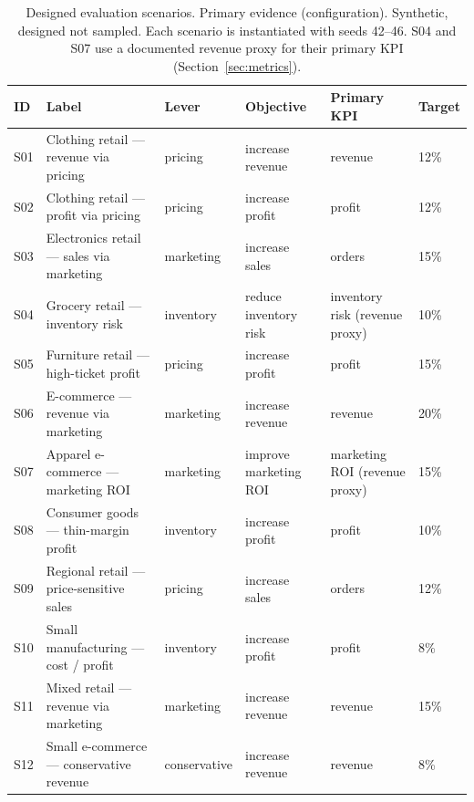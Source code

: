 \documentclass[conference]{IEEEtran}
\begin{document}
\begin{table}[!t]
\caption{Designed evaluation scenarios. Primary evidence (configuration).
Synthetic, designed not sampled. Each scenario is instantiated with seeds
42--46. S04 and S07 use a documented revenue proxy for their primary KPI
(Section~\ref{sec:metrics}).}
\label{tab:scenarios}
\centering
\renewcommand{\arraystretch}{1.15}
\begin{tabular}{@{}llllll@{}}
\toprule
ID & Label & Lever & Objective & Primary KPI & Target\\
\midrule
S01 & Clothing retail --- revenue via pricing   & pricing      & increase revenue        & revenue                       & 12\%\\
S02 & Clothing retail --- profit via pricing    & pricing      & increase profit         & profit                        & 12\%\\
S03 & Electronics retail --- sales via marketing& marketing    & increase sales          & orders                        & 15\%\\
S04 & Grocery retail --- inventory risk         & inventory    & reduce inventory risk   & inventory risk (revenue proxy)& 10\%\\
S05 & Furniture retail --- high-ticket profit   & pricing      & increase profit         & profit                        & 15\%\\
S06 & E-commerce --- revenue via marketing      & marketing    & increase revenue        & revenue                       & 20\%\\
S07 & Apparel e-commerce --- marketing ROI      & marketing    & improve marketing ROI   & marketing ROI (revenue proxy) & 15\%\\
S08 & Consumer goods --- thin-margin profit     & inventory    & increase profit         & profit                        & 10\%\\
S09 & Regional retail --- price-sensitive sales & pricing      & increase sales          & orders                        & 12\%\\
S10 & Small manufacturing --- cost / profit     & inventory    & increase profit         & profit                        & 8\%\\
S11 & Mixed retail --- revenue via marketing    & marketing    & increase revenue        & revenue                       & 15\%\\
S12 & Small e-commerce --- conservative revenue & conservative & increase revenue        & revenue                       & 8\%\\
\bottomrule
\end{tabular}
\end{table}
\end{document}

